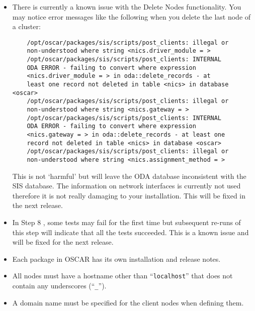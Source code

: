 \begin{itemize}

\item There is currently a known issue with the Delete Nodes functionality.
  You may notice error messages like the following when you delete the
  last node of a cluster:

  \begin{verbatim}
    /opt/oscar/packages/sis/scripts/post_clients: illegal or
    non-understood where string <nics.driver_module = >
    /opt/oscar/packages/sis/scripts/post_clients: INTERNAL
    ODA ERROR - failing to convert where expression
    <nics.driver_module = > in oda::delete_records - at 
    least one record not deleted in table <nics> in database <oscar>
    /opt/oscar/packages/sis/scripts/post_clients: illegal or
    non-understood where string <nics.gateway = >
    /opt/oscar/packages/sis/scripts/post_clients: INTERNAL
    ODA ERROR - failing to convert where expression
    <nics.gateway = > in oda::delete_records - at least one
    record not deleted in table <nics> in database <oscar>
    /opt/oscar/packages/sis/scripts/post_clients: illegal or
    non-understood where string <nics.assignment_method = >
  \end{verbatim}

  This is not `harmful' but will leave the ODA database inconsistent
  with the SIS database.  The information on network interfaces is
  currently not used therefore it is not really damaging to your
  installation.  This will be fixed in the next release.

\item In Step 8 , some tests may fail for the first
  time but subsequent re-runs of this step will indicate that all the
  tests succeeded.  This is a known issue and will be fixed for the next
  release.

\item Each package in OSCAR has its own installation and release
  notes.   

\item All nodes must have a hostname other than ``{\tt localhost}''
  that does not contain any underscores (``{\tt \_}'').
  
\item A domain name must be specified for the client nodes when
  defining them.


\end{itemize}

